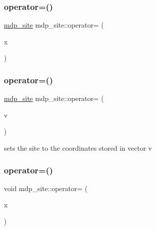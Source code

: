 \mbox{\label{classmdp__site_aee55a3c862cb667839be5febd37b1791}} 
\subsubsection{\texorpdfstring{operator=()}{operator=()}\hspace{0.1cm}{\footnotesize\ttfamily [2/4]}}
{\footnotesize\ttfamily \hyperlink{classmdp__site}{mdp\+\_\+site} mdp\+\_\+site\+::operator= (\begin{DoxyParamCaption}\item[{\hyperlink{classmdp__site}{mdp\+\_\+site}}]{x }\end{DoxyParamCaption})\hspace{0.3cm}{\ttfamily [inline]}}

\mbox{\label{classmdp__site_aa4931841d551417b526a2d2d22751471}} 
\subsubsection{\texorpdfstring{operator=()}{operator=()}\hspace{0.1cm}{\footnotesize\ttfamily [3/4]}}
{\footnotesize\ttfamily \hyperlink{classmdp__site}{mdp\+\_\+site} mdp\+\_\+site\+::operator= (\begin{DoxyParamCaption}\item[{\hyperlink{classmdp__vector}{mdp\+\_\+vector}}]{v }\end{DoxyParamCaption})\hspace{0.3cm}{\ttfamily [inline]}}



sets the site to the coordinates stored in vector v 

\mbox{\label{classmdp__site_a8cf72becd9e8d125b31a5a40862bfa5a}} 
\subsubsection{\texorpdfstring{operator=()}{operator=()}\hspace{0.1cm}{\footnotesize\ttfamily [4/4]}}
{\footnotesize\ttfamily void mdp\+\_\+site\+::operator= (\begin{DoxyParamCaption}\item[{int $\ast$}]{x }\end{DoxyParamCaption})\hspace{0.3cm}{\ttfamily [inline]}}

